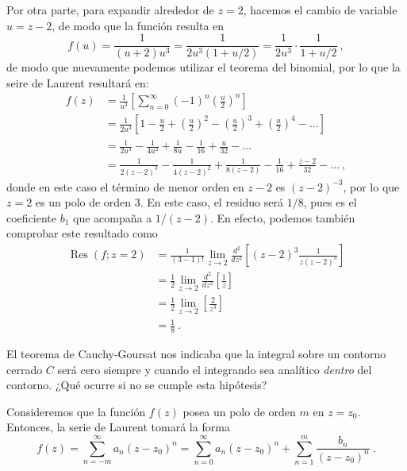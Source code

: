 \begin{ejemplo}
    Por otra parte, para expandir alrededor de $z=2$, hacemos el cambio de variable $u = z-2$, de modo que la función resulta en 
    \begin{equation*}
        f(u) = \frac{1}{(u+2) u^3} = \frac{1}{2u^3 (1+u/2)} = \frac{1}{2u^3} \cdot \frac{1}{1+u/2} \ ,
    \end{equation*}
    de modo que nuevamente podemos utilizar el teorema del binomial, por lo que la seire de Laurent resultará en:
    \begin{align*}
        f(z) & = \frac{1}{u^3} \left[ \sum_{n=0}^\infty (-1)^n \left(\frac{u}{2} \right)^n \right] \\
        & = \frac{1}{2u^3} \left[ 1 - \frac{u}{2} + \left( \frac{u}{2} \right)^2 - \left( \frac{u}{2} \right)^3 + \left( \frac{u}{2} \right)^4 - \dots \right] \\
        & = \frac{1}{2u^3} - \frac{1}{4u^2} + \frac{1}{8u} - \frac{1}{16} + \frac{u}{32} - \dots \\
        & = \frac{1}{2(z-2)^3} - \frac{1}{4(z-2)^2} + \frac{1}{8(z-2)} - \frac{1}{16} + \frac{z-2}{32} - \dots \ ,
    \end{align*}
    donde en este caso el término de menor orden en $z-2$ es $(z-2)^{-3}$, por lo que $z=2$ es un polo de orden 3. En este caso, el residuo será $1/8$, pues es el coeficiente $b_1$ que acompaña a $1/(z-2)$. En efecto, podemos también comprobar este resultado como 
    \begin{align*}
        \operatorname{Res}(f; z=2) & = \frac{1}{(3-1)!}\lim_{z \to 2} \frac{d^2}{dz^2}\left[ (z-2)^3\frac{1}{z(z-2)^3} \right] \\
        & = \frac{1}{2} \lim_{z \to 2} \frac{d^2}{dz^2} \left[ \frac{1}{z} \right] \\
        & = \frac{1}{2} \lim_{z \to 2} \left[ \frac{2}{z^3} \right] \\
        & = \frac{1}{8} \ .
    \end{align*}
\end{ejemplo}

El teorema de Cauchy-Goursat nos indicaba que la integral sobre un contorno cerrado $C$ será cero siempre y cuando el integrando sea analítico \emph{dentro} del contorno. ¿Qué ocurre si no se cumple esta hipótesis?

Consideremos que la función $f(z)$ posea un polo de orden $m$ en $z = z_0$. Entonces, la serie de Laurent tomará la forma 
\begin{equation*}
    f(z) = \sum_{n=-m}^\infty a_n (z-z_0)^n = \sum_{n=0}^\infty a_n (z-z_0)^n + \sum_{n=1}^m \frac{b_n}{(z-z_0)^n} \ .
\end{equation*}

